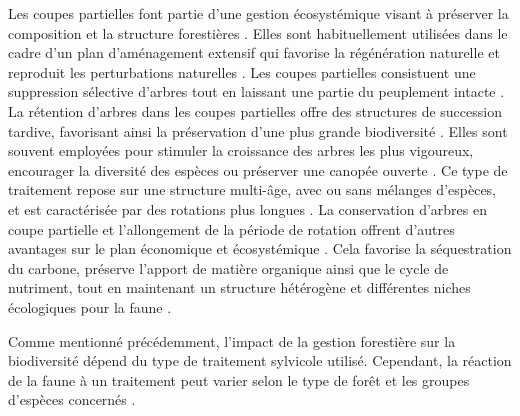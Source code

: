 Les coupes partielles font partie d'une gestion écosystémique visant à préserver la composition et la structure forestières \citep{Bergeron1999Forestmanagementa}.
Elles sont habituellement utilisées dans le cadre d'un plan d'aménagement extensif qui favorise la régénération naturelle et reproduit les perturbations naturelles \citep{Irland2011Timberproductivity}. 
Les coupes partielles consistuent une suppression sélective d'arbres tout en laissant une partie du peuplement intacte \citep{Ameray2021Forestcarbon}. 
La rétention d'arbres dans les coupes partielles offre des structures de succession tardive, favorisant ainsi la préservation d'une plus grande biodiversité \citep{Ameray2021Forestcarbon}.
Elles sont souvent employées pour stimuler la croissance des arbres les plus vigoureux, encourager la diversité des espèces ou préserver une canopée ouverte \citep{Irland2011Timberproductivity}.
Ce type de traitement repose sur une structure multi-âge, avec ou sans mélanges d'espèces, et est caractérisée par des rotations plus longues \citep{Kuuluvainen2009Forestmanagement}. 
La conservation d'arbres en coupe partielle et l'allongement de la période de rotation offrent d'autres avantages sur le plan économique et écosystémique \citep{Ameray2021Forestcarbon}. 
Cela favorise la séquestration du carbone, préserve l'apport de matière organique ainsi que le cycle de nutriment, tout en maintenant un structure hétérogène et différentes niches écologiques pour la faune \citep{Dahlgren1994effectswholetree,Barg1999Influencepartial,Tong2020Forestmanagement,Ameray2021Forestcarbon}.

Comme mentionné précédemment, l'impact de la gestion forestière sur la biodiversité dépend du type de traitement sylvicole utilisé. Cependant, la réaction de la faune à un traitement peut varier selon le type de forêt et les groupes d'espèces concernés \citep{Paillet2010Biodiversitydifferences,Kudrin2023metaanalysiseffects}.

